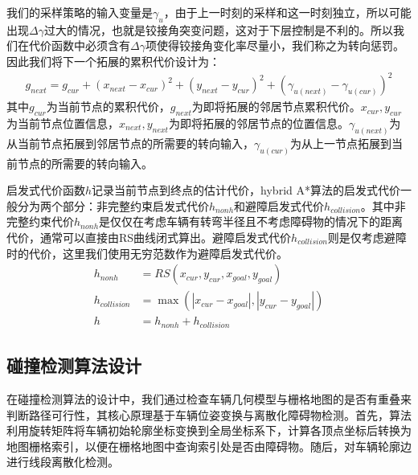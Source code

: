 \documentclass[master,academic]{ysuthesis} %
\begin{document}
		我们的采样策略的输入变量是$\gamma_u$，由于上一时刻的采样和这一时刻独立，所以可能出现$\Delta {\gamma}$过大的情况，也就是铰接角突变问题，这对于下层控制是不利的。所以我们在代价函数中必须含有$\Delta {\gamma}$项使得铰接角变化率尽量小，我们称之为转向惩罚。因此我们将下一个拓展的累积代价设计为：
		\begin{equation}
			\begin{aligned}
				g_{next}=g_{cur}+ (x_{next}-x_{cur} ) ^2+ (y_{next}-y_{cur} ) ^2+ (\gamma _{u(next)}-\gamma _{u (cur)} ) ^2
			\end{aligned}
		\end{equation}
		其中$g_{cur}$为当前节点的累积代价，$g_{next}$为即将拓展的邻居节点累积代价。$x_{cur},y_{cur}$为当前节点位置信息，$x_{next},y_{next}$为即将拓展的邻居节点的位置信息。$\gamma _{u(next)}$为从当前节点拓展到邻居节点的所需要的转向输入，$\gamma _{u(cur)}$为从上一节点拓展到当前节点的所需要的转向输入。

		启发式代价函数$h$记录当前节点到终点的估计代价，hybrid A*算法的启发式代价一般分为两个部分：非完整约束启发式代价$h_{nonh}$和避障启发式代价$h_{collision}$。其中非完整约束代价$h_{nonh}$是仅仅在考虑车辆有转弯半径且不考虑障碍物的情况下的距离代价，通常可以直接由RS曲线闭式算出。避障启发式代价$h_{collision}$则是仅考虑避障时的代价，这里我们使用无穷范数作为避障启发式代价。
		\begin{equation}
			\begin{aligned}
				h_{nonh} &= RS(x_{cur},y_{cur},x_{goal},y_{goal})\\
				h_{collision} &= \max( |x_{cur}-x_{goal}|,|y_{cur}-y_{goal}|)\\
				h &= h_{nonh}+h_{collision}
			\end{aligned}
		\end{equation}

		\subsection{碰撞检测算法设计}
		在碰撞检测算法的设计中，我们通过检查车辆几何模型与栅格地图的是否有重叠来判断路径可行性，其核心原理基于车辆位姿变换与离散化障碍物检测。首先，算法利用旋转矩阵将车辆初始轮廓坐标变换到全局坐标系下，计算各顶点坐标后转换为地图栅格索引，以便在栅格地图中查询索引处是否由障碍物。随后，对车辆轮廓边进行线段离散化检测。
		
\end{document}
